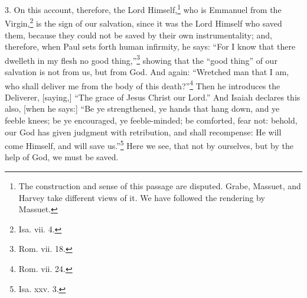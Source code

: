 3. On this account, therefore, the Lord Himself,\footnote{The construction and sense of this passage are disputed. Grabe, Massuet, and Harvey take different views of it. We have followed the rendering by Massuet.} who is Emmanuel from the Virgin,\footnote{Isa. vii. 4.} is the sign of our salvation, since it was the Lord Himself who saved them, because they could not be saved by their own instrumentality; and, therefore, when Paul sets forth human infirmity, he says: “For I know that there dwelleth in my flesh no good thing,”\footnote{Rom. vii. 18.} showing that the “good thing” of our salvation is not from us, but from God. And again: “Wretched man that I am, who shall deliver me from the body of this death?”\footnote{Rom. vii. 24.} Then he introduces the Deliverer, [saying,] “The grace of Jesus Christ our Lord.” And Isaiah declares this also, [when he says:] “Be ye strengthened, ye hands that hang down, and ye feeble knees; be ye encouraged, ye feeble-minded; be comforted, fear not: behold, our God has given judgment with retribution, and shall recompense: He will come Himself, and will save us.”\footnote{Isa. xxv. 3.} Here we see, that not by ourselves, but by the help of God, we must be saved.

